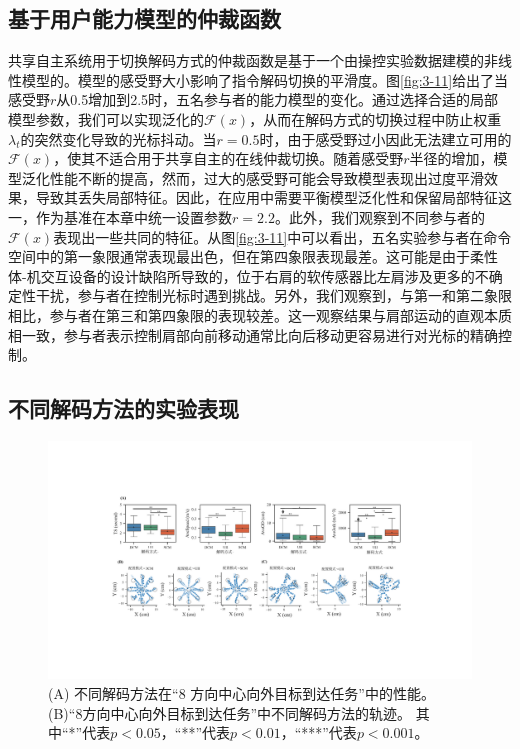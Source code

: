 \subsection{基于用户能力模型的仲裁函数}共享自主系统用于切换解码方式的仲裁函数是基于一个由操控实验数据建模的非线性模型的。模型的感受野大小影响了指令解码切换的平滑度。图\ref{fig:3-11}给出了当感受野$r$从0.5增加到2.5时，五名参与者的能力模型的变化。通过选择合适的局部模型参数，我们可以实现泛化的$\mathcal{F}(x)$，从而在解码方式的切换过程中防止权重$\lambda_t$的突然变化导致的光标抖动。当$r=0.5$时，由于感受野过小因此无法建立可用的$\mathcal{F}(x)$，使其不适合用于共享自主的在线仲裁切换。随着感受野$r$半径的增加，模型泛化性能不断的提高，然而，过大的感受野可能会导致模型表现出过度平滑效果，导致其丢失局部特征。因此，在应用中需要平衡模型泛化性和保留局部特征这一，作为基准在本章中统一设置参数$r=2.2$。此外，我们观察到不同参与者的$\mathcal{F}(x)$表现出一些共同的特征。从图\ref{fig:3-11}中可以看出，五名实验参与者在命令空间中的第一象限通常表现最出色，但在第四象限表现最差。这可能是由于柔性体-机交互设备的设计缺陷所导致的，位于右肩的软传感器比左肩涉及更多的不确定性干扰，参与者在控制光标时遇到挑战。另外，我们观察到，与第一和第二象限相比，参与者在第三和第四象限的表现较差。这一观察结果与肩部运动的直观本质相一致，参与者表示控制肩部向前移动通常比向后移动更容易进行对光标的精确控制。  

\subsection{不同解码方法的实验表现}     

\begin{figure}[!t]
 \includegraphics[width=1\textwidth]{figures/3-Fig-12.pdf}
 \caption{(A) 不同解码方法在“8 方向中心向外目标到达任务”中的性能。 (B)“8方向中心向外目标到达任务”中不同解码方法的轨迹。 其中“*”代表$p<0.05$，“**”代表$p<0.01$，“***”代表$p<0.001$。  }
 \label{fig:3-12}
\end{figure}     

